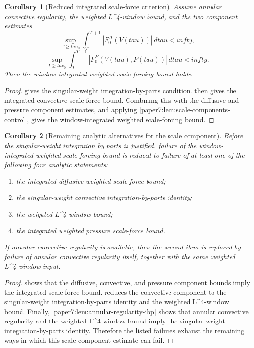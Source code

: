 \documentclass[11pt]{amsart}
\def\({}%
\def\){}%
\def\tau{tau}%
\def\infty{infty}%
\theoremstyle{plain}
\newtheorem{corollary}[corollary]{Corollary}
\theoremstyle{definition}
\theoremstyle{remark}
\begin{document}
\begin{corollary}[Reduced integrated scale-force criterion]
\label{paper7:cor:reduced-window-scale-force}
Assume annular convective regularity, the weighted \(L^4\)-window bound,
and the two component estimates
\[
  \sup_{T\ge\tau_0}
  \int_T^{T+1}|F_0^\Delta(V(\tau))|\,d\tau<\infty,
\]
\[
  \sup_{T\ge\tau_0}
  \int_T^{T+1}|F_0^P(V(\tau),P(\tau))|\,d\tau<\infty.
\]
Then the window-integrated weighted scale-forcing bound holds.
\end{corollary}

\begin{proof}
 gives the singular-weight
integration-by-parts condition.  
then gives the integrated convective scale-force bound.  Combining this with
the diffusive and pressure component estimates, and applying
\cref{paper7:lem:scale-components-control}, gives the window-integrated
weighted scale-forcing bound.
\end{proof}

\begin{corollary}[Remaining analytic alternatives for the scale component]
\label{paper7:cor:scale-component-alternatives}
Before the singular-weight integration by parts is justified, failure of the
window-integrated weighted scale-forcing bound is reduced to failure of at
least one of the following four analytic statements:
\begin{enumerate}[label=\textup{(\roman*)}]
\item the integrated diffusive weighted scale-force bound;
\item the singular-weight convective integration-by-parts identity;
\item the weighted \(L^4\)-window bound;
\item the integrated weighted pressure scale-force bound.
\end{enumerate}
If annular convective regularity is available, then the second item is replaced
by failure of annular convective regularity itself, together with the same
weighted \(L^4\)-window input.
\end{corollary}

\begin{proof}
 shows that the diffusive,
convective, and pressure component bounds imply the integrated scale-force
bound.   reduces the
convective component to the singular-weight integration-by-parts identity and
the weighted \(L^4\)-window bound.  Finally,
\cref{paper7:lem:annular-regularity-ibp} shows that annular convective
regularity and the weighted \(L^4\)-window bound imply the singular-weight
integration-by-parts identity.  Therefore the listed failures exhaust the
remaining ways in which this scale-component estimate can fail.
\end{proof}
\end{document}
